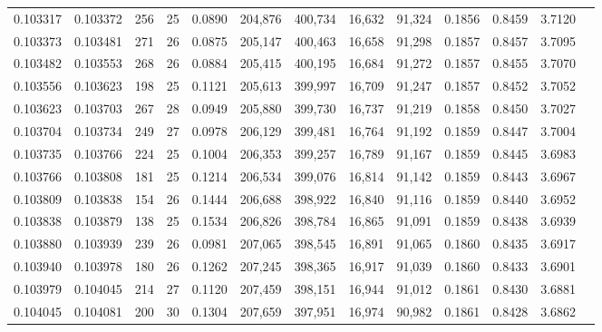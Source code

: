 \begin{tabular}{rrrrrrrrrrrrr}
0.103317 & 0.103372 & 256 &  25 &                                     0.0890 & 204,876 & 400,734 &  16,632 &  91,324 & 0.1856 & 0.8459 & 3.7120 \\
0.103373 & 0.103481 & 271 &  26 &                                     0.0875 & 205,147 & 400,463 &  16,658 &  91,298 & 0.1857 & 0.8457 & 3.7095 \\
0.103482 & 0.103553 & 268 &  26 &                                     0.0884 & 205,415 & 400,195 &  16,684 &  91,272 & 0.1857 & 0.8455 & 3.7070 \\
0.103556 & 0.103623 & 198 &  25 &                                     0.1121 & 205,613 & 399,997 &  16,709 &  91,247 & 0.1857 & 0.8452 & 3.7052 \\
0.103623 & 0.103703 & 267 &  28 &                                     0.0949 & 205,880 & 399,730 &  16,737 &  91,219 & 0.1858 & 0.8450 & 3.7027 \\
0.103704 & 0.103734 & 249 &  27 &                                     0.0978 & 206,129 & 399,481 &  16,764 &  91,192 & 0.1859 & 0.8447 & 3.7004 \\
0.103735 & 0.103766 & 224 &  25 &                                     0.1004 & 206,353 & 399,257 &  16,789 &  91,167 & 0.1859 & 0.8445 & 3.6983 \\
0.103766 & 0.103808 & 181 &  25 &                                     0.1214 & 206,534 & 399,076 &  16,814 &  91,142 & 0.1859 & 0.8443 & 3.6967 \\
0.103809 & 0.103838 & 154 &  26 &                                     0.1444 & 206,688 & 398,922 &  16,840 &  91,116 & 0.1859 & 0.8440 & 3.6952 \\
0.103838 & 0.103879 & 138 &  25 &                                     0.1534 & 206,826 & 398,784 &  16,865 &  91,091 & 0.1859 & 0.8438 & 3.6939 \\
0.103880 & 0.103939 & 239 &  26 &                                     0.0981 & 207,065 & 398,545 &  16,891 &  91,065 & 0.1860 & 0.8435 & 3.6917 \\
0.103940 & 0.103978 & 180 &  26 &                                     0.1262 & 207,245 & 398,365 &  16,917 &  91,039 & 0.1860 & 0.8433 & 3.6901 \\
0.103979 & 0.104045 & 214 &  27 &                                     0.1120 & 207,459 & 398,151 &  16,944 &  91,012 & 0.1861 & 0.8430 & 3.6881 \\
0.104045 & 0.104081 & 200 &  30 &                                     0.1304 & 207,659 & 397,951 &  16,974 &  90,982 & 0.1861 & 0.8428 & 3.6862 \\

\end{tabular}
